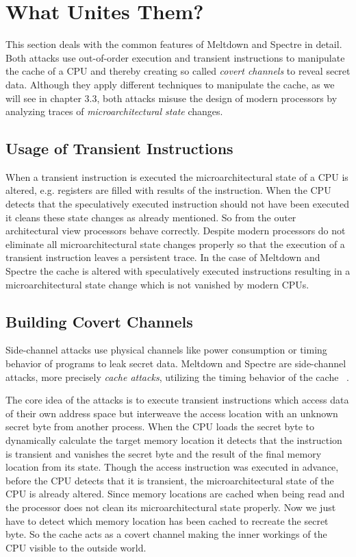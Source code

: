 \documentclass[a4paper,oneside,openright] {scrreprt}
\begin{document}
\section{What Unites Them?}
\label{ch:intro:motivation}

This section deals with the common features of Meltdown and Spectre in detail. 
Both attacks use out-of-order execution and transient instructions to manipulate the cache of a CPU and thereby
creating so called \textit{covert channels} to reveal secret data. Although they apply different techniques to 
manipulate the cache, as we will see in chapter 3.3, both attacks misuse the design of modern processors
by analyzing traces of \textit{microarchitectural state} changes. 

\subsection{Usage of Transient Instructions}
\label{ch:intro:motivation:A}

When a transient instruction is executed the microarchitectural state of a CPU is altered, e.g. registers are filled with results
of the instruction. When the CPU detects that the speculatively executed instruction should not have been executed it cleans these state
changes as already mentioned. So from the outer architectural view processors behave correctly. 
Despite modern processors do not eliminate all microarchitectural state changes properly so that the execution of a transient instruction
 leaves a persistent trace. In the case of Meltdown and Spectre the cache is altered with speculatively executed instructions resulting
 in a microarchitectural state change which is not vanished by modern CPUs.

 \subsection{Building Covert Channels}
\label{ch:intro:motivation:A}

Side-channel attacks use physical channels like power consumption or timing behavior of programs to
leak secret data. Meltdown and Spectre are side-channel attacks, more precisely \textit{cache attacks}, 
utilizing the timing behavior of the cache ~\cite{osvik2006cache}.

The core idea of the attacks is to execute transient instructions which access data of their own address space
 but interweave the access location with an unknown secret byte from another process. 
 When the CPU loads the secret byte to dynamically calculate the target memory location 
it detects that the instruction is transient and vanishes the secret byte and the result of the final memory location from its state. 
Though the access instruction was executed in advance, before the CPU detects that it is transient, the microarchitectural state
 of the CPU is already altered.
 Since memory locations are cached when being read and the processor does not clean its microarchitectural state properly.
 Now we just have to detect which memory location has been cached to recreate the secret byte.
 So the cache acts as a covert channel making the inner workings of the CPU visible to the outside world.
\end{document}
